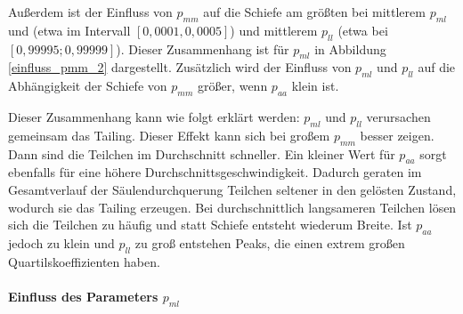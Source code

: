 Außerdem ist der Einfluss von $p_{mm}$ auf die Schiefe am größten bei mittlerem $p_{ml}$ und (etwa im Intervall $[0,0001, 0,0005]$) und mittlerem $p_{ll}$ (etwa bei $[0,99995; 0,99999]$). Dieser Zusammenhang ist für $p_{ml}$ in Abbildung \ref{einfluss_pmm_2} dargestellt.
Zusätzlich wird der Einfluss von $p_{ml}$ und $p_{ll}$ auf die Abhängigkeit der Schiefe von $p_{mm}$ größer, wenn $p_{aa}$ klein ist.


Dieser Zusammenhang kann wie folgt erklärt werden: $p_{ml}$ und $p_{ll}$ verursachen gemeinsam das Tailing. Dieser Effekt kann sich bei großem $p_{mm}$ besser zeigen. Dann sind die Teilchen im Durchschnitt schneller. Ein kleiner Wert für $p_{aa}$ sorgt ebenfalls für eine höhere Durchschnittsgeschwindigkeit. Dadurch geraten im Gesamtverlauf der Säulendurchquerung Teilchen seltener in den gelösten Zustand, wodurch sie das Tailing erzeugen. Bei durchschnittlich langsameren Teilchen lösen sich die Teilchen zu häufig und statt Schiefe entsteht wiederum Breite.
Ist $p_{aa}$ jedoch zu klein und $p_{ll}$ zu groß entstehen Peaks, die einen extrem großen Quartilskoeffizienten haben. %



\paragraph*{Einfluss des Parameters $p_{ml}$}

